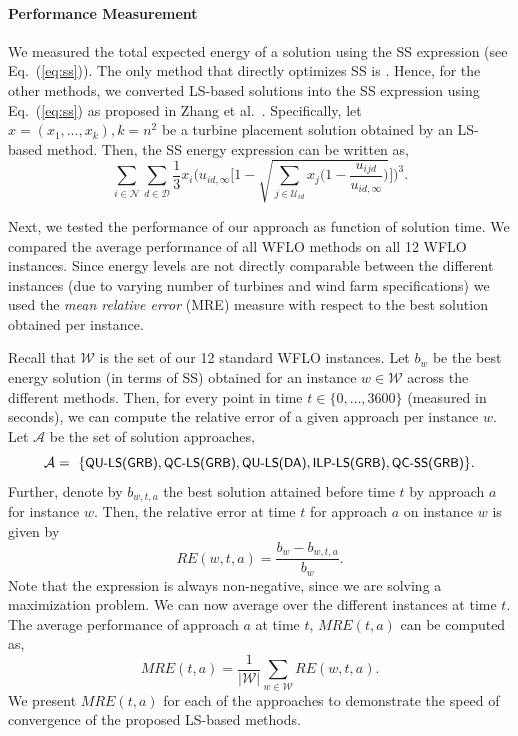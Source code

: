 \documentclass[preprint,12pt]{elsarticle}
\newcommand{\qclsgrb}{{\sf {\small QC-LS(GRB)\xspace}}}
\newcommand{\ilplsgrb}{{\sf {\small ILP-LS(GRB)\xspace}}}
\newcommand{\qulsgrb}{{\sf {\small QU-LS(GRB)\xspace}}}
\newcommand{\qcssgrb}{{\sf {\small QC-SS(GRB)\xspace}}}
\newcommand{\qulsda}{{\sf {\small QU-LS(DA)\xspace}}}
\begin{document}
\paragraph{Performance Measurement} 

We measured the total expected energy of a solution using the SS expression (see Eq.~(\ref{eq:ss})).
The only method that directly optimizes SS is \qcssgrb{}. Hence, for the other methods, we converted
LS-based solutions into the SS expression using Eq.~(\ref{eq:ss}) as proposed in Zhang et al.\ \cite{Zhang2014}. Specifically, let $x = (x_1, \ldots, x_k), k=n^2$ be a turbine placement solution obtained by an LS-based method.
Then, the SS energy expression can be written as, 
$$\sum_{i\in \mathcal{N}}\sum_{d \in \mathcal{D}} \frac{1}{3} x_i \Bigg(u_{id,\infty} \Bigg[1-\sqrt{\sum_{j\in \mathcal{U}_{id}}x_j\bigg( 1-\frac{u_{ijd}}{u_{id,\infty}} \bigg) } \Bigg]    \Bigg)^3.$$ 

Next, we tested the performance of our approach as function of solution time. We 
compared the average performance of all WFLO methods on all 12 WFLO instances. Since energy levels are not directly comparable between the different instances (due to varying number of turbines and wind farm specifications) we used the \emph{mean relative error} (MRE) measure with respect to the best solution obtained per instance.

Recall that $\mathcal{W}$ is the set of our 12 standard WFLO instances. 
Let $b_w$ be the best energy solution (in terms of SS) obtained for an instance $w \in \mathcal{W}$ 
across the different methods.
Then, for every point in time $t \in \{0,\ldots, 3600\}$ (measured in seconds), we can compute the relative error of a given approach per instance $w$. Let $\mathcal{A}$ be the set of solution approaches, $$\mathcal{A}= \mbox{
	\{\emph{\qulsgrb}}, \mbox{\emph{\qclsgrb}}, \mbox{\emph{\qulsda}}, \mbox{\emph{\ilplsgrb}}, \mbox{\emph{\qcssgrb}}\}.$$ Further, denote by $b_{w,t,a}$ the best solution attained before time $t$ by approach $a$ for instance $w$. Then, the relative error at time $t$ for approach $a$ on instance $w$ is given by
\begin{equation}
  RE(w,t,a) = \frac{b_w - b_{w,t,a}}{b_w}.
\end{equation} Note that the expression is always non-negative, since we are solving a maximization problem. We can now average over the different instances at time $t$. The average performance of approach $a$ at time $t$, $MRE(t,a)$ can be computed as, \begin{equation} MRE(t,a) = \frac{1}{|\mathcal{W}|}\sum_{ w\in\mathcal{W}} RE(w,t,a).\end{equation}
We present $MRE(t,a)$ for each of the approaches to demonstrate the speed of convergence of the proposed LS-based methods.
\end{document}
